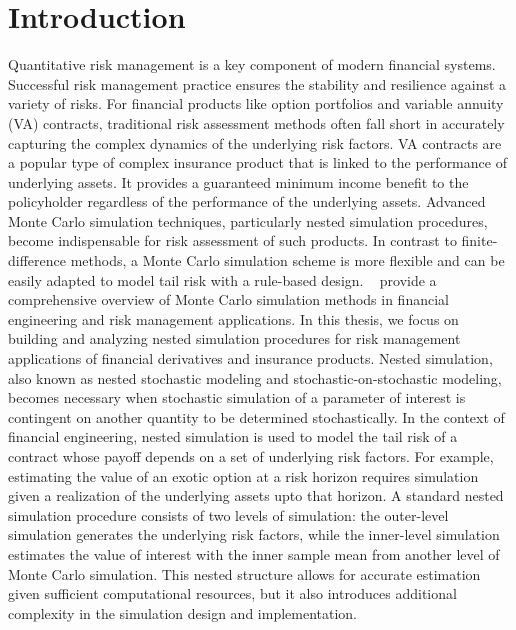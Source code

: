 \chapter{Introduction}

Quantitative risk management is a key component of modern financial systems.
Successful risk management practice ensures the stability and resilience against a variety of risks.
For financial products like option portfolios and variable annuity (VA) contracts, traditional risk assessment methods often fall short in accurately capturing the complex dynamics of the underlying risk factors.
VA contracts are a popular type of complex insurance product that is linked to the performance of underlying assets.
It provides a guaranteed minimum income benefit to the policyholder regardless of the performance of the underlying assets.
Advanced Monte Carlo simulation techniques, particularly nested simulation procedures, become indispensable for risk assessment of such products.
In contrast to finite-difference methods, a Monte Carlo simulation scheme is more flexible and can be easily adapted to model tail risk with a rule-based design.
~\cite{glasserman2004monte} provide a comprehensive overview of Monte Carlo simulation methods in financial engineering and risk management applications.
In this thesis, we focus on building and analyzing nested simulation procedures for risk management applications of financial derivatives and insurance products.
Nested simulation, also known as nested stochastic modeling and stochastic-on-stochastic modeling, becomes necessary when stochastic simulation of a parameter of interest is contingent on another quantity to be determined stochastically.
In the context of financial engineering, nested simulation is used to model the tail risk of a contract whose payoff depends on a set of underlying risk factors.
For example, estimating the value of an exotic option at a risk horizon requires simulation given a realization of the underlying assets upto that horizon.
A standard nested simulation procedure consists of two levels of simulation: the outer-level simulation generates the underlying risk factors, while the inner-level simulation estimates the value of interest with the inner sample mean from another level of Monte Carlo simulation.
This nested structure allows for accurate estimation given sufficient computational resources, but it also introduces additional complexity in the simulation design and implementation.
